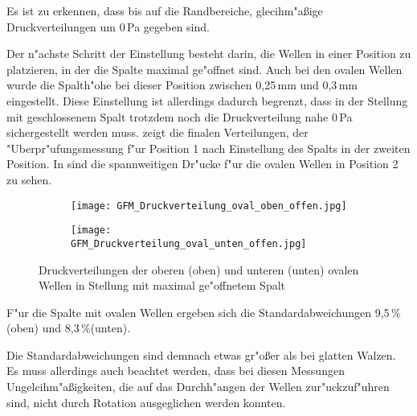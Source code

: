 Es ist zu erkennen, dass bis auf die Randbereiche, glecihm"a\ss{}ige Druckverteilungen um 0\,Pa gegeben sind.

Der n"achste Schritt der Einstellung besteht darin, die Wellen in einer Position zu platzieren, in der die Spalte maximal ge"offnet sind. Auch bei den ovalen Wellen wurde die Spalth"ohe bei dieser Position zwischen 0,25\,mm und 0,3\,mm eingestellt. Diese Einstellung ist allerdings dadurch begrenzt, dass in der Stellung mit geschlossenem Spalt trotzdem noch die Druckverteilung nahe 0\,Pa sichergestellt werden muss.  zeigt die finalen Verteilungen, der "Uberpr"ufungsmessung f"ur Position 1 nach Einstellung des Spalts in der zweiten Position.  
In  sind die spannweitigen Dr"ucke f"ur die ovalen Wellen in Position 2 zu sehen.

\begin{figure}[h]
	\centering
	\begin{subfigure}[c]{0.85\textwidth}		
		\texttt{[image: GFM\_Druckverteilung\_oval\_oben\_offen.jpg]}
	\end{subfigure}
	\begin{subfigure}[c]{0.85\textwidth}
		\texttt{[image: GFM\_Druckverteilung\_oval\_unten\_offen.jpg]}
	\end{subfigure}
	\caption{Druckverteilungen der oberen (oben) und unteren (unten) ovalen Wellen in Stellung mit maximal ge"offnetem Spalt}
	\label{fig:Druckverteilung_oval_offen}
\end{figure}

F"ur die Spalte mit ovalen Wellen ergeben sich die Standardabweichungen 9,5\,\% (oben) und 8,3\,\%(unten).

Die Standardabweichungen sind demnach etwas gr"o\ss{}er als bei glatten Walzen. Es muss allerdings auch beachtet werden, dass bei diesen Messungen Ungelcihm"a\ss{}igkeiten, die auf das Durchh"angen der Wellen zur"uckzuf"uhren sind, nicht durch Rotation ausgeglichen werden konnten.
